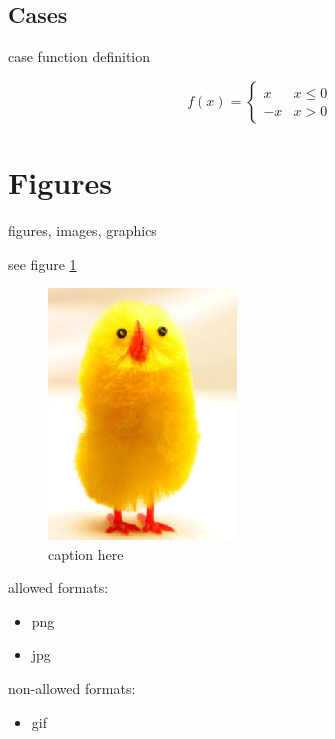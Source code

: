 \documentclass[12pt]{article}
\begin{document}
\subsection{Cases}\label{cases}

    case function definition

    \begin{equation}
        f(x) =
        \begin{cases}
            x & x \le 0 \\
            -x & x>0
        \end{cases}
    \end{equation}

\section{Figures}\label{secTab}

    figures, images, graphics

    see figure \ref{fig-label}

    \begin{figure}[htb]
        \centering
        \includegraphics[width=5cm]{image.png}
        \caption{caption here}
        \label{fig-label}
    \end{figure}

    allowed formats:

    \begin{itemize}
        \item png
        \item jpg
    \end{itemize}

    non-allowed formats:

    \begin{itemize}
        \item gif
    \end{itemize}
\end{document}

